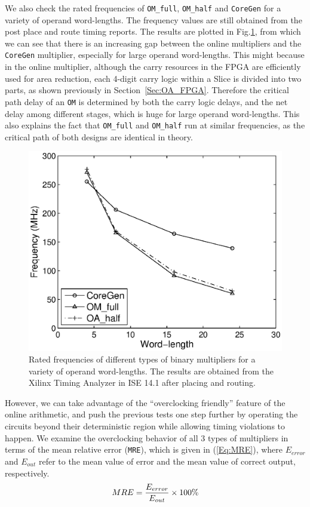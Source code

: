 \documentclass[conference]{IEEEtran}
\begin{document}
We also check the rated frequencies of \texttt{OM\_full}, \texttt{OM\_half} and \texttt{CoreGen} for a variety of operand word-lengths. The frequency values are still obtained from the post place and route timing reports. The results are plotted in Fig.\ref{Fig:OM_Freq}, from which we can see that there is an increasing gap between the online multipliers and the \texttt{CoreGen} multiplier, especially for large operand word-lengths. This might because in the online multiplier, although the carry resources in the FPGA are efficiently used for area reduction, each 4-digit carry logic within a Slice is divided into two parts, as shown previously in Section~\ref{Sec:OA_FPGA}. Therefore the critical path delay of an \texttt{OM} is determined by both the carry logic delays, and the net delay among different stages, which is huge for large operand word-lengths. This also explains the fact that \texttt{OM\_full} and \texttt{OM\_half} run at similar frequencies, as the critical path of both designs are identical in theory.

\begin{figure}[tbp]
	\centering
	\includegraphics[width=.48\textwidth]{./Figures/Exp/OM_Freq.eps}
	\caption{Rated frequencies of different types of binary multipliers for a variety of operand word-lengths. The results are obtained from the Xilinx Timing Analyzer in ISE 14.1 after placing and routing.}
	\label{Fig:OM_Freq}

\end{figure}

However, we can take advantage of the ``overclocking friendly'' feature of the online arithmetic, and push the previous tests one step further by operating the circuits beyond their deterministic region while allowing timing violations to happen. We examine the overclocking behavior of all 3 types of multipliers in terms of the mean relative error (\texttt{MRE}), which is given in (\ref{Eq:MRE}), where $E_{error}$ and $E_{out}$ refer to the mean value of error and the mean value of correct output, respectively.
%
\begin{eqnarray}\label{Eq:MRE}
  MRE=\frac{E_{error}}{E_{out}}\times100\%
  \vspace{-1ex}
\end{eqnarray}
\end{document}
